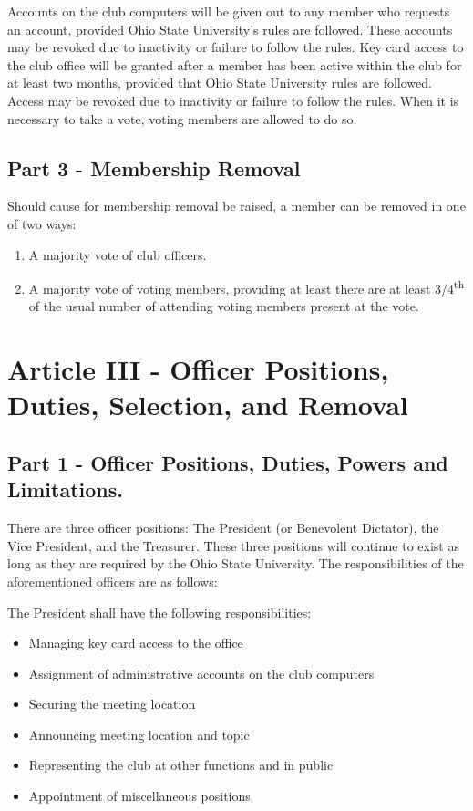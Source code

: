 \documentclass{article}
\begin{document}
	Accounts on the club computers will be given out to any member who requests an account, provided Ohio State University's rules are followed.  These accounts may be revoked due to inactivity or failure to follow the rules.  Key card access to the club office will be granted after a member has been active within the club for at least two months, provided that Ohio State University rules are followed.  Access may be revoked due to inactivity or failure to follow the rules.
	When it is necessary to take a vote, voting members are allowed to do so.

	\subsection{Part 3 - Membership Removal}

	Should cause for membership removal be raised, a member can be removed in one of two ways:
	\begin{enumerate}
		\item A majority vote of club officers.
		\item A majority vote of voting members, providing at least there are at least 3/4\textsuperscript{th} of the usual number of attending voting members present at the vote.
	\end{enumerate}

	\section{Article III - Officer Positions, Duties, Selection, and Removal}

	\subsection{Part 1 - Officer Positions, Duties, Powers and Limitations.}

	There are three officer positions: The President (or Benevolent Dictator), the Vice President, and the Treasurer.  These three positions will continue to exist as long as they are required by the Ohio State University.  The responsibilities of the aforementioned officers are as follows:

	The President shall have the following responsibilities:

	\begin{itemize}
		\item Managing key card access to the office
		\item Assignment of administrative accounts on the club computers
		\item Securing the meeting location
		\item Announcing meeting location and topic
		\item Representing the club at other functions and in public
		\item Appointment of miscellaneous positions
	\end{itemize}
\end{document}
